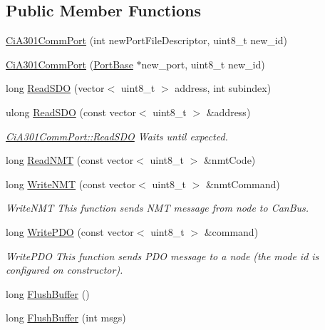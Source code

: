 \subsection*{Public Member Functions}
\begin{DoxyCompactItemize}
\item 
\hyperlink{classCiA301CommPort_aae705cb5c6a405ef74a10e5220d0b08f}{Ci\+A301\+Comm\+Port} (int new\+Port\+File\+Descriptor, uint8\+\_\+t new\+\_\+id)
\item 
\hyperlink{classCiA301CommPort_a1e05c4b292cfee36ff9eeddb2c8eb4c0}{Ci\+A301\+Comm\+Port} (\hyperlink{classPortBase}{Port\+Base} $\ast$new\+\_\+port, uint8\+\_\+t new\+\_\+id)
\item 
long \hyperlink{classCiA301CommPort_a0fd0920052684589bc37bb898dcdd758}{Read\+S\+DO} (vector$<$ uint8\+\_\+t $>$ address, int subindex)
\item 
ulong \hyperlink{classCiA301CommPort_a403c1de504a2a5c36c90dd977e1bd536}{Read\+S\+DO} (const vector$<$ uint8\+\_\+t $>$ \&address)
\begin{DoxyCompactList}\small\item\em \hyperlink{classCiA301CommPort_a0fd0920052684589bc37bb898dcdd758}{Ci\+A301\+Comm\+Port\+::\+Read\+S\+DO} Waits until expected. \end{DoxyCompactList}\item 
long \hyperlink{classCiA301CommPort_a02df85ed5140d0d7a57fe0d2f6e47ea1}{Read\+N\+MT} (const vector$<$ uint8\+\_\+t $>$ \&nmt\+Code)
\item 
long \hyperlink{classCiA301CommPort_a09feb3f78831c9fbb683a85cc3bc4562}{Write\+N\+MT} (const vector$<$ uint8\+\_\+t $>$ \&nmt\+Command)
\begin{DoxyCompactList}\small\item\em Write\+N\+MT This function sends N\+MT message from node to Can\+Bus. \end{DoxyCompactList}\item 
long \hyperlink{classCiA301CommPort_a56d2c604b11363e6b287f59b68a546bd}{Write\+P\+DO} (const vector$<$ uint8\+\_\+t $>$ \&command)
\begin{DoxyCompactList}\small\item\em Write\+P\+DO This function sends P\+DO message to a node (the mode id is configured on constructor). \end{DoxyCompactList}\item 
long \hyperlink{classCiA301CommPort_a067cddaf01932fa6fa27255c61b08190}{Flush\+Buffer} ()
\item 
long \hyperlink{classCiA301CommPort_ab29e221039a2d21d1446edb09b91864e}{Flush\+Buffer} (int msgs)

\end{DoxyCompactItemize}

